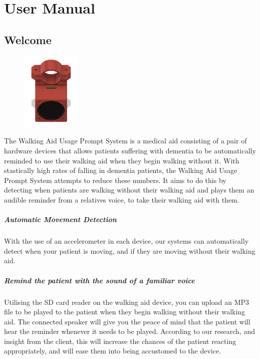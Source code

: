 \chapter{User Manual}
\label{ch:usermanual}

	\section{Welcome}
	\label{sec:welcome}

		\begin{figure}
			\vspace{-5em}
			\centering
			\includegraphics[width=0.25\textwidth]{graphics/final-cad.png}
		\end{figure}

		The Walking Aid Usage Prompt System is a medical aid consisting of a pair of hardware devices that allows patients suffering with dementia to be automatically reminded to use their walking aid when they begin walking without it. With stastically high rates of falling in dementia patients, the Walking Aid Usage Prompt System attempts to reduce these numbers. It aims to do this by detecting when patients are walking without their walking aid and plays them an audible reminder from a relatives voice, to take their walking aid with them.

		\paragraph{Automatic Movement Detection}\mbox{}

		With the use of an accelerometer in each device, our systems can automatically detect when your patient is moving, and if they are moving without their walking aid.

		\paragraph{Remind the patient with the sound of a familiar voice}\mbox{}

		Utilising the SD card reader on the walking aid device, you can upload an MP3 file to be played to the patient when they begin walking without their walking aid. The connected speaker will give you the peace of mind that the patient will hear the reminder whenever it needs to be played. According to our research, and insight from the client, this will increase the chances of the patient reacting appropriately, and will ease them into being accustomed to the device.

